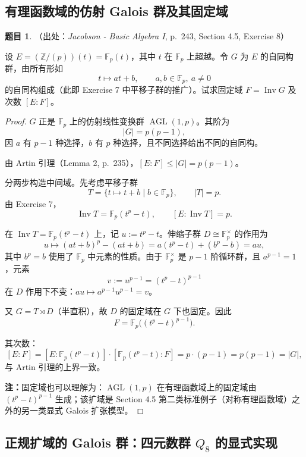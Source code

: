 \documentclass[a4paper]{ctexart}
\theoremstyle{definition}
\newtheorem{example}{题目}[section]
\theoremstyle{analysis}
\theoremstyle{plain}
\begin{document}
\subsection{\texorpdfstring{有理函数域的仿射 Galois 群及其固定域}{有理函数域的仿射 Galois 群及其固定域}}\label{subsec:problem-affine-galois}

\begin{example}
（出处：\textit{Jacobson - Basic Algebra I}, p.~243, Section 4.5, Exercise 8）

设 \(E=(\mathbb Z/(p))(t)=\mathbb F_p(t)\)，其中 \(t\) 在 \(\mathbb F_p\) 上超越。令 \(G\) 为 \(E\) 的自同构群，由所有形如
\[
  t\mapsto at+b,\qquad a,b\in\mathbb F_p,\ a\neq 0
\]
的自同构组成（此即 Exercise 7 中平移子群的推广）。试求固定域 \(F=\operatorname{Inv}G\) 及次数 \([E:F]\)。

\begin{proof}
\(G\) 正是 \(\mathbb F_p\) 上的仿射线性变换群 \(\operatorname{AGL}(1,p)\)。其阶为
\[
  |G|=p(p-1),
\]
因 \(a\) 有 \(p-1\) 种选择，\(b\) 有 \(p\) 种选择，且不同选择给出不同的自同构。

由 Artin 引理（Lemma 2, p.~235），\([E:F]\le |G|=p(p-1)\)。

分两步构造中间域。先考虑平移子群
\[
  T=\{t\mapsto t+b\mid b\in\mathbb F_p\},\qquad |T|=p.
\]
由 Exercise 7，
\[
  \operatorname{Inv}T=\mathbb F_p(t^p-t),\qquad [E:\operatorname{Inv}T]=p.
\]

在 \(\operatorname{Inv}T=\mathbb F_p(t^p-t)\) 上，记 \(u:=t^p-t\)。伸缩子群 \(D\cong\mathbb F_p^\times\) 的作用为
\[
  u\mapsto (at+b)^p-(at+b)=a(t^p-t)+(b^p-b)=au,
\]
其中 \(b^p=b\) 使用了 \(\mathbb F_p\) 中元素的性质。由于 \(\mathbb F_p^\times\) 是 \(p-1\) 阶循环群，且 \(a^{p-1}=1\)，元素
\[
  v:=u^{p-1}=(t^p-t)^{p-1}
\]
在 \(D\) 作用下不变：\(au\mapsto a^{p-1}u^{p-1}=v\)。

又 \(G=T\rtimes D\)（半直积），故 \(D\) 的固定域在 \(G\) 下也固定。因此
\[
  F=\mathbb F_p\bigl((t^p-t)^{p-1}\bigr).
\]

其次数：
\[
  [E:F]=[E:\mathbb F_p(t^p-t)]\cdot [\mathbb F_p(t^p-t):F]=p\cdot(p-1)=p(p-1)=|G|,
\]
与 Artin 引理的上界一致。

\textbf{注：}固定域也可以理解为：\(\operatorname{AGL}(1,p)\) 在有理函数域上的固定域由 \((t^p-t)^{p-1}\) 生成；该扩域是 Section 4.5 第二类标准例子（对称有理函数域）之外的另一类显式 Galois 扩张模型。
\end{proof}
\end{example}

\subsection{\texorpdfstring{正规扩域的 Galois 群：四元数群 \texorpdfstring{\(Q_8\)}{Q8} 的显式实现}{正规扩域的 Galois 群：四元数群 Q8 的显式实现}}\label{subsec:problem-quartic-normal}
\end{document}
